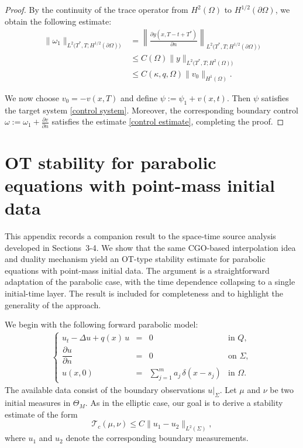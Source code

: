 \documentclass[12pt]{amsart}
\begin{document}
\begin{proof}
By the continuity of the trace operator from $H^2(\Omega)$ to $H^{1/2}(\partial\Omega)$, we obtain the following estimate:
\begin{align*}
\|\omega_1\|_{L^2\big(T^*, T; H^{1/2}(\partial\Omega)\big)}
&= \left\| \frac{\partial y(x, T - t + T^*)}{\partial n} \right\|_{L^2\big(T^*, T; H^{1/2}(\partial\Omega)\big)} \\
&\leq C(\Omega) \|y\|_{L^2\big(T^*, T; H^2(\Omega)\big)} \\
&\leq C(\kappa, q, \Omega) \|v_0\|_{H^1(\Omega)}.
\end{align*}

We now choose $v_0 = -v(x, T)$ and define $\psi := \psi_1 + v(x, t)$. Then $\psi$ satisfies the target system \eqref{control system}. Moreover, the corresponding boundary control $\omega := \omega_1 + \frac{\partial v}{\partial n}$ satisfies the estimate \eqref{control estimate}, completing the proof.
\end{proof}


\section{OT stability for parabolic equations with point-mass initial data}
\label{appendix:initial-data}


This appendix records a companion result to the space-time source analysis 
developed in Sections~3-4. We show that the same CGO-based interpolation 
idea and duality mechanism yield an OT-type stability estimate for parabolic 
equations with point-mass initial data. The argument is a straightforward 
adaptation of the parabolic case, with the time dependence collapsing to a 
single initial-time layer. The result is included for completeness and to 
highlight the generality of the approach.

We begin with the following forward parabolic model:
\begin{align}\label{directmodel 2}
\left\{
\begin{array}{ccll}
  u_t - \Delta u + q(x)\,u &=& 0
  & \text{in } Q , \\[0.4em]
  \dfrac{\partial u}{\partial n} &=& 0 
  & \text{on } \Sigma ,\\[0.4em]
  u(x,0) &=& \displaystyle\sum_{j=1}^{m} a_j\,\delta(x-s_j)
  & \text{in } \Omega.
\end{array}
\right.
\end{align}
The available data consist of the boundary observations \(u|_{\Sigma}\).
Let \(\mu\) and \(\nu\) be two initial measures in \(\Theta_M\). 
As in the elliptic case, our goal is to derive a stability estimate of the form
\[
    \mathcal{T}_c(\mu,\nu)\leq C\|u_1-u_2\|_{L^2(\Sigma)},
\]
where \(u_1\) and \(u_2\) denote the corresponding boundary measurements.
\end{document}
